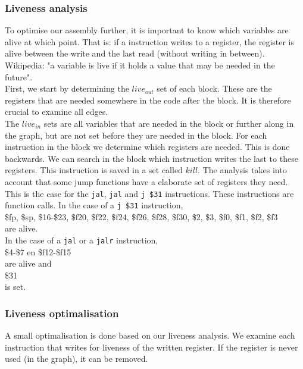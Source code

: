 \subsubsection{Liveness analysis}
To optimise our assembly further, it is important to know which variables are
alive at which point. That is: if a instruction writes to a register, the
register is alive between the write and the last read (without writing in 
between). Wikipedia: "a variable is live if it holds a value that may be needed 
in the future". \\
First, we start by determining the $live_{out}$ set of each block. These
are the registers that are needed somewhere in the code after the block. It 
is therefore crucial to examine all edges. \\
The $live_{in} $ sets are all variables that are needed in the block or further
along in the graph, but are not set before they are needed in the block.
For each instruction in the block we determine which registers are needed. This 
is done backwards. We can search in the block which instruction writes the last
to these registers. This instruction is saved in a set called $kill$. The 
analysis takes into account that some jump functions have a elaborate set of
registers they need. This is the case for the \texttt{jal}, \texttt{jal} and 
\texttt{j \$31} instructions. These instructions are function calls.
In the case of a \texttt{j \$31} instruction,\\
\$fp, \$sp, \$16-\$23, \$f20, \$f22, \$f24, \$f26, \$f28, \$f30, \$2, \$3, \$f0, \$f1, \$f2, \$f3 \\are alive. \\
In the case of a \texttt{jal} or a \texttt{jalr} instruction,\\
\$4-\$7 en \$f12-\$f15 \\
are alive and \\
\$31 \\
is set.

\subsubsection{Liveness optimalisation}
A small optimalisation is done based on our liveness analysis. We examine each
instruction that writes for liveness of the written register. If the register 
is never used (in the graph), it can be removed.
